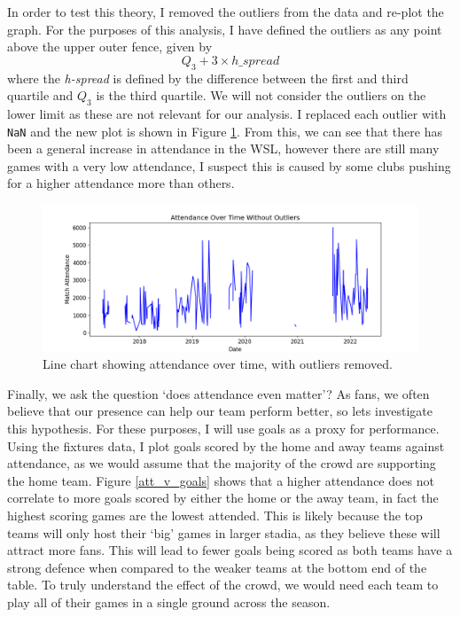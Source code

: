 \documentclass[12pt, a4paper, twocolumn]{article}
\begin{document}
In order to test this theory, I removed the outliers from the data and re-plot the graph. For the purposes of this analysis, I have defined the outliers as any point above the upper outer fence, given by
\begin{equation}
 Q_3 + 3 \times h\_spread
\end{equation}
where the \textit{h-spread} is defined by the difference between the first and third quartile and $Q_3$ is the third quartile. We will not consider the outliers on the lower limit as these are not relevant for our analysis. I replaced each outlier with \verb|NaN| and the new plot is shown in Figure \ref{att_ot_noout}. From this, we can see that there has been a general increase in attendance in the WSL, however there are still many games with a very low attendance, I suspect this is caused by some clubs pushing for a higher attendance more than others.

\begin{figure}
  \includegraphics[width=\linewidth]{../vis/fixtures/attendance_overtime_no_outliers.png}
  \caption{Line chart showing attendance over time, with outliers removed.}
  \label{att_ot_noout}
\end{figure}

Finally, we ask the question `does attendance even matter'? As fans, we often believe that our presence can help our team perform better, so lets investigate this hypothesis. For these purposes, I will use goals as a proxy for performance. Using the fixtures data, I plot goals scored by the home and away teams against attendance, as we would assume that the majority of the crowd are supporting the home team. Figure \ref{att_v_goals} shows that a higher attendance does not correlate to more goals scored by either the home or the away team, in fact the highest scoring games are the lowest attended. This is likely because the top teams will only host their `big' games in larger stadia, as they believe these will attract more fans. This will lead to fewer goals being scored as both teams have a strong defence when compared to the weaker teams at the bottom end of the table. To truly understand the effect of the crowd, we would need each team to play all of their games in a single ground across the season.
\end{document}
